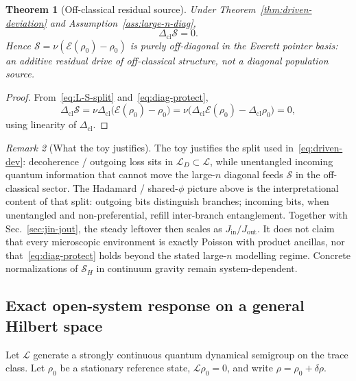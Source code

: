 \documentclass[11pt]{article}
\newtheorem{theorem}{Theorem}[section]
\theoremstyle{definition}
\theoremstyle{remark}
\newtheorem{remark}[theorem]{Remark}
\begin{document}
\begin{theorem}[Off-classical residual source]
\label{thm:offdiag-source}
Under Theorem~\ref{thm:driven-deviation} and Assumption~\ref{ass:large-n-diag},
\begin{equation}
  \Delta_{\mathrm{cl}}\mathcal S=0.
\end{equation}
Hence $\mathcal S=\nu(\mathcal E(\rho_0)-\rho_0)$ is purely off-diagonal in the Everett pointer basis: an additive residual drive of off-classical structure, not a diagonal population source.
\end{theorem}

\begin{proof}
From~\eqref{eq:L-S-split} and~\eqref{eq:diag-protect},
\[
  \Delta_{\mathrm{cl}}\mathcal S
  =\nu\Delta_{\mathrm{cl}}\bigl(\mathcal E(\rho_0)-\rho_0\bigr)
  =\nu\bigl(\Delta_{\mathrm{cl}}\mathcal E(\rho_0)-\Delta_{\mathrm{cl}}\rho_0\bigr)
  =0,
\]
using linearity of $\Delta_{\mathrm{cl}}$.
\end{proof}

\begin{remark}[What the toy justifies]
\label{rem:toy-scope}
The toy justifies the split used in~\eqref{eq:driven-dev}: decoherence / outgoing loss sits in $\mathcal L_D\subset\mathcal L$, while unentangled incoming quantum information that cannot move the large-$n$ diagonal feeds $\mathcal S$ in the off-classical sector.
The Hadamard / shared-$\phi$ picture above is the interpretational content of that split: outgoing bits distinguish branches; incoming bits, when unentangled and non-preferential, refill inter-branch entanglement.
Together with Sec.~\ref{sec:jin-jout}, the steady leftover then scales as $J_{\mathrm{in}}/J_{\mathrm{out}}$.
It does not claim that every microscopic environment is exactly Poisson with product ancillas, nor that~\eqref{eq:diag-protect} holds beyond the stated large-$n$ modelling regime.
Concrete normalizations of $\mathcal S_H$ in continuum gravity remain system-dependent.
\end{remark}

\subsection{Exact open-system response on a general Hilbert space}
Let $\mathcal L$ generate a strongly continuous quantum dynamical semigroup on the trace class.
Let $\rho_0$ be a stationary reference state, $\mathcal L\rho_0=0$, and write $\rho=\rho_0+\delta\rho$.
\end{document}
